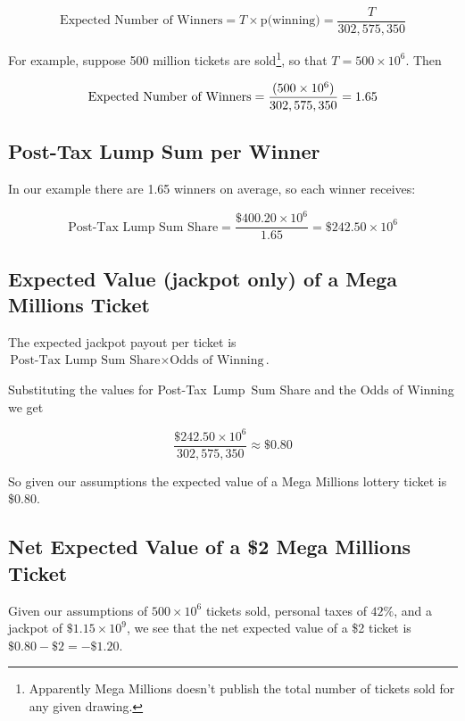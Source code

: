 \documentclass{article}
\theoremstyle{definition}
\begin{document}
\begin{equation*}
\text{Expected Number of Winners} = T \times \text{p(winning)} = \dfrac{T}{302,575,350}
\end{equation*}

\bigskip
\noindent
For example, suppose 500 million tickets are
sold\footnote{Apparently Mega Millions doesn't publish the total
number of tickets sold for any given drawing.}, so that $T = 500
\times 10^6$. Then 


\medskip
\begin{equation*}
\text{Expected Number of Winners} = \dfrac{(500\times 10^6)}{302,575,350} = 1.65
\vspace{3.25 cm}
\end{equation*}


\subsection{Post-Tax Lump Sum per Winner}
In our example there are 1.65 winners on average, so each winner receives:

\medskip
\begin{equation*}
\text{Post-Tax Lump Sum Share} = \dfrac{\$400.20 \times 10^6}{1.65} = \$242.50 \times 10^6
\end{equation*}


\subsection{Expected Value (jackpot only) of a Mega Millions Ticket}
The expected jackpot payout per ticket is $\text{Post-Tax Lump Sum Share} 
\times \text{Odds of Winning}$.


\bigskip
\noindent
Substituting the values for Post-Tax Lump Sum Share and the 
Odds of Winning we get

\medskip
\begin{equation*}
\dfrac{\$242.50 \times 10^6}{302,575,350} \approx \$0.80
\end{equation*}

\bigskip
\noindent
So given our assumptions the expected value of a Mega Millions 
lottery ticket is \$0.80.

\smallskip
\subsection{Net Expected Value of a \$2 Mega Millions Ticket}
Given our assumptions of $500 \times 10^6$ tickets sold, personal
taxes of $42\%$, and a jackpot of $\$1.15 \times 10^9$, we see
that the net expected value of a \$2 ticket is $\$0.80 - \$2 = -\$1.20$.
%
%
%
\end{document}
